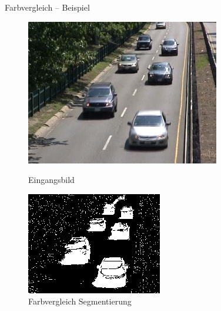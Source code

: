\documentclass[hyperref={pdfpagelabels=false}]{beamer}
\begin{document}
\begin{frame}[t]{Farbvergleich -- Beispiel}
	\vspace{1.65em}
	\begin{figure}
		\centering
		\begin{minipage}{0.45\linewidth}
			\includegraphics[width=1\linewidth]{Abbildungen/Eingang3.jpg}
			\caption*{Eingangsbild}
		\end{minipage}
		\begin{minipage}{0.45\linewidth}
			\includegraphics[width=1\linewidth]{Abbildungen/color_decision.jpg}
			\caption*{Farbvergleich Segmentierung}
		\end{minipage}
	\end{figure}
\end{frame}
\end{document}

